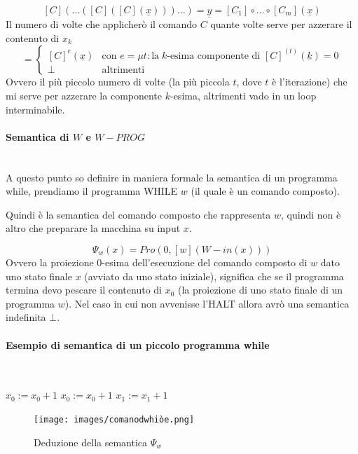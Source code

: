 \documentclass{article}
\begin{document}
\begin{itemize}
\begin{itemize}
                    $$[C](\dots([C]([C](\underline{x})))\dots)=\underline{y}=[C_1]\circ\dots\circ[C_m](\underline{x})$$
                    Il numero di volte che applicherò il comando $C$ quante volte serve per azzerare il contenuto di $x_k$
                    \[
                        =
                        \begin{cases}
                            [C]^e(\underline{x}) & \text{con }e=\mu t :\text{la}\;k\text{-esima componente di }[C]^{(t)}(\underline{k})=0 \\
                            \bot                 & \text{altrimenti}
                        \end{cases}
                    \]
                    Ovvero il più piccolo numero di volte (la più piccola $t$, dove $t$ è l'iterazione) che mi serve
                    per azzerare la componente $k$-esima, altrimenti vado in un loop interminabile.
          \end{itemize}
\end{itemize}

\paragraph{Semantica di $W$ e $W-PROG$}\mbox{}\\
A questo punto so definire in maniera formale la semantica
di un programma while, prendiamo il programma WHILE $w$ (il quale è un comando composto).

Quindi è la semantica del comando composto che rappresenta $w$, quindi non è altro che preparare
la macchina su input $x$.

$$\Psi_w(x)=Pro(0,[w](W-in(x)))$$
Ovvero la proiezione $0$-esima dell'esecuzione del comando composto di $w$ dato uno stato finale $x$ (avviato
da uno stato iniziale),
significa che se il programma termina devo pescare il contenuto di $x_0$ (la proiezione di uno stato finale
di un programma $w$).
Nel caso in cui non avvenisse l'HALT allora avrò una semantica indefinita $\bot$.
\paragraph{Esempio di semantica di un piccolo programma while}\mbox{}\\
\begin{algorithm}[hbt!]
    \caption{$w:\Psi_w(n)=2n$}\label{alg:psi_2n}
    {
        $x_0:=x_0+1$\;
        $x_0:=x_0+1$\;
        $x_1:=x_1+1$\;
    }
\end{algorithm}
\begin{figure}[H]
    \centering
    \texttt{[image: images/comanodwhiòe.png]}
    \caption{Deduzione della semantica $\Psi_w$}
\end{figure}
\end{document}
